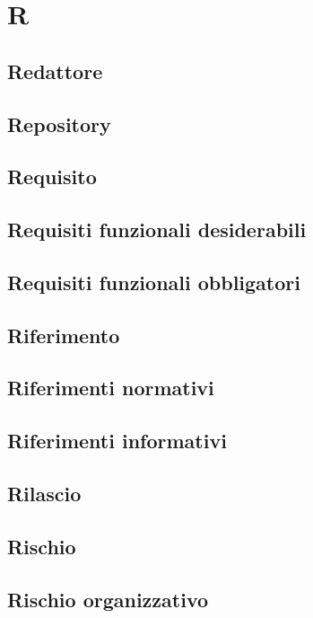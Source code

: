 \section{R} 
\subsection{Redattore} 

\subsection{Repository} 

\subsection{Requisito} 

\subsection{Requisiti funzionali desiderabili} 

\subsection{Requisiti funzionali obbligatori} 

\subsection{Riferimento} 

\subsection{Riferimenti normativi} 

\subsection{Riferimenti informativi} 

\subsection{Rilascio} 

\subsection{Rischio} 

\subsection{Rischio organizzativo} 

